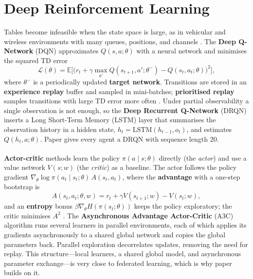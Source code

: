 \documentclass[12pt,a4paper,final]{extreport}
\begin{document}
\section{Deep Reinforcement Learning}

\paragraph{} Tables become infeasible when the state space is large, as in vehicular and wireless environments with many queues, positions, and channels \cite{p1}. The \textbf{Deep Q-Network} (DQN) \cite{mnih2015} approximates $Q(s,a;\theta)$ with a neural network and minimises the squared TD error
\begin{equation}
\mathcal{L}(\theta)=\mathbb{E}\Big[\big(r_t+\gamma\max_{a'}Q(s_{t+1},a';\theta^{-})-Q(s_t,a_t;\theta)\big)^{2}\Big],
\end{equation}
where $\theta^{-}$ is a periodically updated \textbf{target network}. Transitions are stored in an \textbf{experience replay} buffer and sampled in mini-batches; \textbf{prioritised replay} samples transitions with large TD error more often \cite{p2}. Under partial observability a single observation is not enough, so the \textbf{Deep Recurrent Q-Network} (DRQN) \cite{hausknecht2015} inserts a Long Short-Term Memory (LSTM) layer that summarises the observation history in a hidden state, $h_t=\mathrm{LSTM}(h_{t-1},o_t)$, and estimates $Q(h_t,a;\theta)$. Paper \cite{p2} gives every agent a DRQN with sequence length 20.

\paragraph{} \textbf{Actor-critic} methods learn the policy $\pi(a\mid s;\theta)$ directly (the \emph{actor}) and use a value network $V(s;w)$ (the \emph{critic}) as a baseline. The actor follows the policy gradient $\nabla_{\theta}\log\pi(a_t\mid s_t;\theta)\,A(s_t,a_t)$, where the \textbf{advantage} with a one-step bootstrap is
\begin{equation}
A(s_t,a_t;\theta,w)=r_t+\gamma V(s_{t+1};w)-V(s_t;w),
\end{equation}
and an \textbf{entropy} bonus $\beta\nabla_{\theta}H(\pi(s_t;\theta))$ keeps the policy exploratory; the critic minimises $A^{2}$ \cite{p1}. The \textbf{Asynchronous Advantage Actor-Critic} (A3C) algorithm \cite{mnih2016} runs several learners in parallel environments, each of which applies its gradients asynchronously to a shared global network and copies the global parameters back. Parallel exploration decorrelates updates, removing the need for replay. This structure---local learners, a shared global model, and asynchronous parameter exchange---is very close to federated learning, which is why paper \cite{p1} builds on it.
\end{document}
